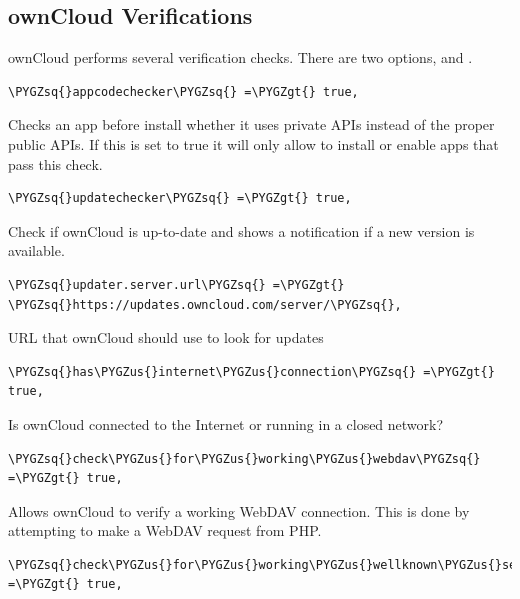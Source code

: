 \documentclass[letterpaper,10pt,english]{sphinxmanual}
\def\PYGZus{\char`\_}
\def\PYGZgt{\char`\>}
\def\PYGZsq{\char`\'}
\renewcommand\PYGZsq{\textquotesingle}
\begin{document}
\subsection{ownCloud Verifications}
\label{configuration_server/config_sample_php_parameters:owncloud-verifications}
ownCloud performs several verification checks. There are two options,
 and .

\begin{Verbatim}[commandchars=\\\{\}]
\PYGZsq{}appcodechecker\PYGZsq{} =\PYGZgt{} true,
\end{Verbatim}

Checks an app before install whether it uses private APIs instead of the
proper public APIs. If this is set to true it will only allow to install or
enable apps that pass this check.

\begin{Verbatim}[commandchars=\\\{\}]
\PYGZsq{}updatechecker\PYGZsq{} =\PYGZgt{} true,
\end{Verbatim}

Check if ownCloud is up-to-date and shows a notification if a new version is
available.

\begin{Verbatim}[commandchars=\\\{\}]
\PYGZsq{}updater.server.url\PYGZsq{} =\PYGZgt{} \PYGZsq{}https://updates.owncloud.com/server/\PYGZsq{},
\end{Verbatim}

URL that ownCloud should use to look for updates

\begin{Verbatim}[commandchars=\\\{\}]
\PYGZsq{}has\PYGZus{}internet\PYGZus{}connection\PYGZsq{} =\PYGZgt{} true,
\end{Verbatim}

Is ownCloud connected to the Internet or running in a closed network?

\begin{Verbatim}[commandchars=\\\{\}]
\PYGZsq{}check\PYGZus{}for\PYGZus{}working\PYGZus{}webdav\PYGZsq{} =\PYGZgt{} true,
\end{Verbatim}

Allows ownCloud to verify a working WebDAV connection. This is done by
attempting to make a WebDAV request from PHP.

\begin{Verbatim}[commandchars=\\\{\}]
\PYGZsq{}check\PYGZus{}for\PYGZus{}working\PYGZus{}wellknown\PYGZus{}setup\PYGZsq{} =\PYGZgt{} true,
\end{Verbatim}
\end{document}
